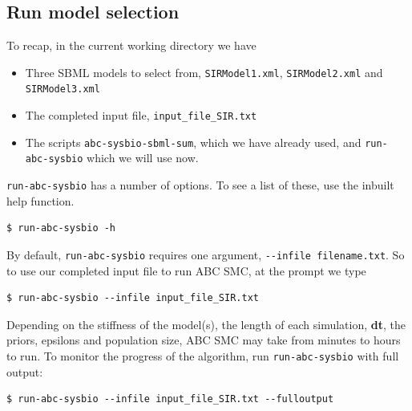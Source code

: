 \documentclass[a4paper]{report}
\begin{document}
\subsection*{Run model selection}
To recap, in the current working directory we have
\begin{itemize}
\item Three SBML models to select from, \verb$SIRModel1.xml$, \verb$SIRModel2.xml$ and \verb$SIRModel3.xml$
\item The completed input file, \verb$input_file_SIR.txt$
\item The scripts \verb$abc-sysbio-sbml-sum$, which we have already used, and \verb$run-abc-sysbio$ which we will use now.
\end{itemize}
\verb$run-abc-sysbio$ has a number of options. To see a list of these, use the inbuilt help function.
\begin{verbatim}
$ run-abc-sysbio -h
\end{verbatim}
By default, \verb$run-abc-sysbio$ requires one argument, \verb$--infile filename.txt$. So to use our completed input file to run ABC SMC, at the prompt we type
\begin{verbatim}
$ run-abc-sysbio --infile input_file_SIR.txt
\end{verbatim}
Depending on the stiffness of the model(s), the length of each simulation, \textbf{dt}, the priors, epsilons and population size, ABC SMC may take from minutes to hours to run. To monitor the progress of the algorithm, run \verb$run-abc-sysbio$ with full output:
\begin{verbatim}
$ run-abc-sysbio --infile input_file_SIR.txt --fulloutput
\end{verbatim}
\end{document}
